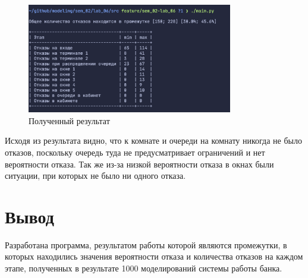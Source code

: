 \begin{figure}[H]
    \centering
    \includegraphics[width=0.8\textwidth]{img/content/result.png}
    \caption{Полученный результат}
    \label{fig:result}
\end{figure}

Исходя из результата видно, что к комнате и очереди на комнату никогда не было отказов, поскольку очередь туда не предусматривает ограничений и нет вероятности отказа. Так же из-за низкой вероятности отказа в окнах были ситуации, при которых не было ни одного отказа.

\section{Вывод}

Разработана программа, результатом работы которой являются промежутки, в которых находились значения вероятности отказа и количества отказов на каждом этапе, полученных в результате 1000 моделирований системы работы банка.
